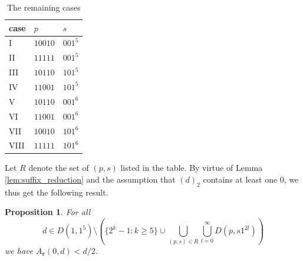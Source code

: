 \documentclass[a4paper,11pt]{amsart}
\newtheorem{prop}[thm]{Proposition}
\theoremstyle{definition}
\begin{document}
\begin{table}[H] 
\begin{tabular}{l|l|l}
case & $p$ & $s$                   \\ \hline
I & $10010$         & $001^{5}$   \\
II & $11111$        & $001^{5}$            \\
III & $10110$         & $101^{5}$        \\
IV & $11001$         & $101^{5}$   \\
V & $10110$         & $001^{6}$  \\
VI & $11001$         & $001^{6}$  \\
VII & $10010$         & $101^{6}$  \\
VIII & $11111$         & $101^{6}$  
\end{tabular}
\caption{The remaining cases}
\label{tab:no_admissible}
\end{table}

Let $R$ denote the set of $(p,s)$ listed in the table. By virtue of Lemma \ref{lem:suffix_reduction} and the assumption that $(d)_2$ contains at least one $0$, we thus get the following result.

\begin{prop}  \label{prop:application_2}
    For all 
    $$d \in D(1,1^5) \setminus \left(\{2^k-1: k \geq 5\} \cup \bigcup_{(p,s) \in R} \bigcup_{l = 0}^{\infty} D(p,s1^{2l}) \right)$$ we have $A_{\mathbf{r}}(0,d) < d/2$.
\end{prop}
\end{document}
